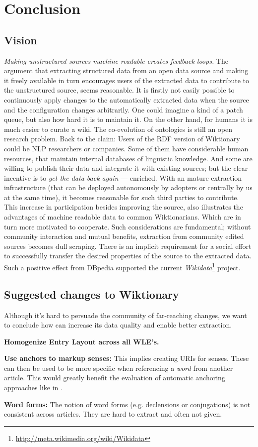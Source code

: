 \section{Conclusion}
\subsection{Vision}
\textit{Making unstructured sources machine-readable creates feedback loops.}
The argument that extracting structured data from an open data source and making it freely available in turn encourages users of the extracted data to contribute to the unstructured source, seems reasonable. It is firstly not easily possible to continuously apply changes to the automatically extracted data when the source and the configuration changes arbitrarily. One could imagine a kind of a patch queue, but also how hard it is to maintain it. On the other hand, for humans it is much easier to curate a wiki. The co-evolution of ontologies is still an open research problem.
Back to the claim: Users of the RDF version of Wiktionary could be NLP researchers or companies. Some of them have considerable human resources, that maintain internal databases of linguistic knowledge. And some are willing to publish their data and integrate it with existing sources; but the clear incentive is to \textit{get the data back again} --- enriched. With an mature extraction infrastructure (that can be deployed autonomously by adopters or centrally by us at the same time), it becomes reasonable for such third parties to contribute.
This increase in participation besides improving the source, also illustrates the advantages of machine readable data to common Wiktionarians. Which are in turn more motivated to cooperate. Such considerations are fundamental; without community interaction and mutual benefits, extraction from community edited sources becomes dull scraping. There is an implicit requirement for a social effort to successfully transfer the desired properties of the source to the extracted data.
Such a positive effect from DBpedia supported the current \textit{Wikidata}\footnote{\url{http://meta.wikimedia.org/wiki/Wikidata}} project.

\subsection{Suggested changes to Wiktionary}
Although it's hard to persuade the community of far-reaching changes, we want to conclude how \wik can increase its data quality and enable better extraction.
\begin{compactitem}
\item \textbf{Homogenize Entry Layout across all WLE's.}
\item \textbf{Use anchors to markup senses:}
	This implies creating URIs for senses.
	These can then be used to be more specific when referencing a \textit{word} from another article. 
	This would greatly benefit the evaluation of automatic anchoring approaches like in \cite{meyer_2011b}.
\item \textbf{Word forms:}
	The notion of word forms (e.g. declensions or conjugations) is not consistent across articles.
	They are hard to extract and often not given.
\end{compactitem}

